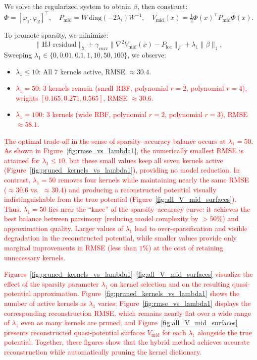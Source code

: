 \documentclass[11pt]{article}
\theoremstyle{plain}      %
\theoremstyle{definition} %
\begin{document}
We solve the regularized system to obtain \( \beta \), then construct:
\[
\Phi = [\varphi_1, \varphi_2]^\top, \quad
P_{\mathrm{mid}} = W\,\mathrm{diag}(-2\lambda_i)W^{-1}, \quad
V_{\mathrm{mid}}(x) = \tfrac12 \Phi(x)^\top P_{\mathrm{mid}} \Phi(x).
\]

To promote sparsity, we minimize:
\[
\|\text{HJ residual}\|_2 + \gamma_{\text{curv}} \|\nabla^2 V_{\text{mid}}(\bar{x}) - P_{\mathrm{loc}}\|_F + \lambda_1 \|\beta\|_1,
\]
Sweeping \( \lambda_1 \in \{0, 0.01, 0.1, 1, 10, 50, 100\} \), we observe:
\begin{itemize}
  \item \( \lambda_1 \le 10 \): All 7 kernels active, RMSE \( \approx 30.4 \).
  \item \textcolor{red}{\( \lambda_1 = 50 \): 3 kernels remain (small RBF, polynomial \( r = 2 \), polynomial \( r = 4 \)), weights \( [0.165, 0.271, 0.565] \), RMSE \( \approx 30.6 \).}
  \item \textcolor{red}{\( \lambda_1 = 100 \): 3 kernels (wide RBF, polynomial \( r = 2 \), polynomial \( r = 3 \)), RMSE \( \approx 58.1 \).}
\end{itemize}

\textcolor{red}{The optimal trade-off in the sense of sparsity--accuracy balance occurs at $\lambda_1 = 50$. As shown in Figure~\ref{fig:rmse_vs_lambda1}, the numerically smallest RMSE is attained for $\lambda_1 \leq 10$, but these small values keep all seven kernels active (Figure~\ref{fig:pruned_kernels_vs_lambda1}), providing no model reduction. In contrast, $\lambda_1 = 50$ removes four kernels while maintaining nearly the same RMSE ($\approx 30.6$ vs.\ $\approx 30.4$) and producing a reconstructed potential visually indistinguishable from the true potential (Figure~\ref{fig:all_V_mid_surfaces}). Thus, $\lambda_1 = 50$ lies near the ``knee'' of the sparsity--accuracy curve: it achieves the best balance between parsimony (reducing model complexity by $>50\%$) and approximation quality. Larger values of $\lambda_1$ lead to over-sparsification and visible degradation in the reconstructed potential, while smaller values provide only marginal improvements in RMSE (less than $1\%$) at the cost of retaining unnecessary kernels.}

\textcolor{red}{Figures~\ref{fig:pruned_kernels_vs_lambda1}--\ref{fig:all_V_mid_surfaces} visualize the effect of the sparsity parameter $\lambda_1$ on kernel selection and on the resulting quasi-potential approximation. Figure~\ref{fig:pruned_kernels_vs_lambda1} shows the number of active kernels as $\lambda_1$ varies; Figure~\ref{fig:rmse_vs_lambda1} displays the corresponding reconstruction RMSE, which remains nearly flat over a wide range of $\lambda_1$ even as many kernels are pruned; and Figure~\ref{fig:all_V_mid_surfaces} presents reconstructed quasi-potential surfaces $V_{\mathrm{mid}}$ for each $\lambda_1$ alongside the true potential. Together, these figures show that the hybrid method achieves accurate reconstruction while automatically pruning the kernel dictionary.}
\end{document}
